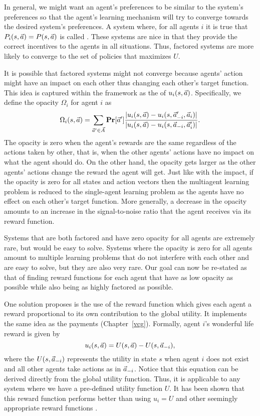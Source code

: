 In general, we might want an agent's preferences to be similar to the
system's preferences so that the agent's learning mechanism will try
to converge towards the desired system's preferences. A system where,
for all agents $i$ it is true that $P_i(s,\vec{a}) = P(s,\vec{a})$ is called
. These systems are nice in that they provide the correct
incentives to the agents in all situations. Thus, factored systems are
more likely to converge to the set of policies that maximizes $U$. 

It is possible that factored systems might not converge because
agents' action might have an impact on each other thus changing each
other's target function.  This idea is captured within the 
framework as the  of $u_i(s,\vec{a})$. Specifically, we define
the opacity $\Omega_i$ for agent $i$ as
\begin{equation}
  \label{eq:opacity}
  \Omega_i(s,\vec{a}) = \sum_{\vec{a}' \in \vec{A}} \mathbf{Pr}[\vec{a}']
  \frac{|u_i(s,\vec{a}) - u_i(s,\vec{a}'_{-i},\vec{a}_i)|}{|u_i(s,\vec{a}) - u_i(s,\vec{a}_{-i},\vec{a}'_{i})|}.
\end{equation}
The opacity is zero when the agent's rewards are the same regardless
of the actions taken by other, that is, when the other agents' actions
have no impact on what the agent should do. On the other hand, the
opacity gets larger as the other agents' actions change the reward the
agent will get. Just like with the  impact, if the opacity
is zero for all states and action vectors then the multiagent learning
problem is reduced to the single-agent learning problem as the agents
have no effect on each other's target function. More generally, a
decrease in the opacity amounts to an increase in the signal-to-noise
ratio that the agent receives via its reward function.

Systems that are both factored and have zero opacity for all agents
are extremely rare, but would be easy to solve. Systems where the
opacity is zero for all agents amount to multiple learning problems
that do not interfere with each other and are easy to solve, but they
are also very rare. Our goal can now be re-stated as that of finding
reward functions for each agent that have as low opacity as possible
while also being as highly factored as possible.

One solution  proposes is the use of the  reward function which gives each agent a reward proportional
to its own contribution to the global utility. It implements the same
idea as the  payments (Chapter~\ref{vcg}). Formally, agent
$i$'s wonderful life reward is given by
\begin{equation}
  \label{eq:wonderful-life}
  u_i(s,\vec{a}) = U(s, \vec{a}) - U(s,\vec{a}_{-i}),
\end{equation}
where the $U(s,\vec{a}_{-i})$ represents the utility in state $s$ when
agent $i$ does not exist and all other agents take actions as in
$\vec{a}_{-i}$. Notice that this equation can be derived directly from the
global utility function. Thus, it is applicable to any system where we
have a pre-defined utility function $U$. It has been shown that this
reward function performs better than using $u_i = U$ and other
seemingly appropriate reward functions \cite{wolpert99b,tumer04a}.

